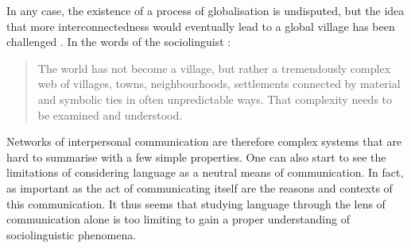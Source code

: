 \documentclass[../thesis.tex]{subfiles}
\begin{document}
In any case, the existence of a process of globalisation is undisputed, but the idea that more
interconnectedness would eventually lead to a global village has been challenged
\cite{NorrisCosmopolitanCommunications2009,BlommaertSociolinguisticsGlobalization2010}.
In the words of the sociolinguist
:

\begin{quote}
  The world has not become a village, but rather a tremendously complex web of villages,
  towns, neighbourhoods, settlements connected by material and symbolic ties in often
  unpredictable ways. That complexity needs to be examined and understood.
  \cite{BlommaertSociolinguisticsGlobalization2010}
\end{quote}
 
Networks of interpersonal communication are therefore complex systems that are hard to
summarise with a few simple properties. One can also start to see the limitations of
considering language as a neutral means of communication. In fact, as important as the
act of communicating itself are the reasons and contexts of this communication. It thus
seems that studying language through the lens of communication alone is too limiting to
gain a proper understanding of sociolinguistic phenomena.





\end{document}

